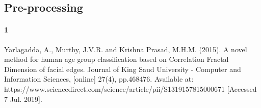 \documentclass{article}
\begin{document}
    \subsection{Pre-processing}
    \paragraph{1}
    Yarlagadda, A., Murthy, J.V.R. and Krishna Prasad, M.H.M. (2015). A novel method for human age group classification based on Correlation Fractal Dimension of facial edges. Journal of King Saud University - Computer and Information Sciences, [online] 27(4), pp.468\textendash{}476. Available at: https://www.sciencedirect.com/science/article/pii/S1319157815000671 [Accessed 7 Jul. 2019].
\end{document}
